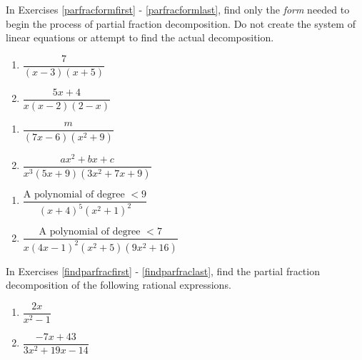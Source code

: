 \documentclass{ximera}
\begin{document}
	\author{Stitz-Zeager}


\label{ExercisesforParFrac}

In Exercises \ref{parfracformfirst} - \ref{parfracformlast},  find only the \emph{form} needed to begin the process of partial fraction decomposition.  Do not create the system of linear equations or attempt to find the actual decomposition.

\begin{multicols}{2}
\begin{enumerate}

\item $\dfrac{7}{(x - 3)(x + 5)}$ \label{parfracformfirst}
\item $\dfrac{5x + 4}{x(x - 2)(2 - x)}$

\setcounter{HW}{\value{enumi}}
\end{enumerate}
\end{multicols}

\begin{multicols}{2}
\begin{enumerate}
\setcounter{enumi}{\value{HW}}


\item $\dfrac{m}{(7x - 6)(x^{2} + 9)}$
\item $\dfrac{ax^{2} + bx + c}{x^3(5x + 9)(3x^{2} + 7x + 9)}$

\setcounter{HW}{\value{enumi}}
\end{enumerate}
\end{multicols}

\begin{multicols}{2}
\begin{enumerate}
\setcounter{enumi}{\value{HW}}

\item $\dfrac{\text{A polynomial of degree } < 9}{(x + 4)^{5}(x^{2} + 1)^{2}}$
\item $\dfrac{\text{A polynomial of degree } < 7}{x(4x - 1)^{2}(x^{2} + 5)(9x^{2} + 16)}$ \label{parfracformlast}

\setcounter{HW}{\value{enumi}}
\end{enumerate}
\end{multicols}


In Exercises \ref{findparfracfirst} - \ref{findparfraclast},  find the partial fraction decomposition of the following rational expressions.

\begin{multicols}{2}
\begin{enumerate}
\setcounter{enumi}{\value{HW}}

\item $\dfrac{2x}{x^{2} - 1}$  \label{findparfracfirst}
\item $\dfrac{-7x + 43}{3x^{2} + 19x - 14}$

\setcounter{HW}{\value{enumi}}
\end{enumerate}
\end{multicols}
\end{document}

